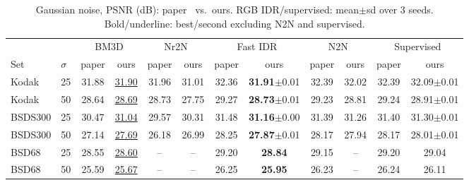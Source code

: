 \begin{table}[!t]
\centering
\caption{Gaussian noise, PSNR (dB): paper~\cite{zhang2022idr} vs.\ ours. RGB IDR/supervised: mean$\pm$sd over 3 seeds. Bold/underline: best/second excluding N2N and supervised.}
\label{tab:img_gauss}
\begin{tabular}{llcccccccccc}
\toprule
& & \multicolumn{2}{c}{BM3D} & \multicolumn{2}{c}{Nr2N} & \multicolumn{2}{c}{Fast IDR} & \multicolumn{2}{c}{N2N} & \multicolumn{2}{c}{Supervised} \\
\cmidrule(lr){3-4}\cmidrule(lr){5-6}\cmidrule(lr){7-8}\cmidrule(lr){9-10}\cmidrule(lr){11-12}
Set & $\sigma$ & paper & ours & paper & ours & paper & ours & paper & ours & paper & ours \\
\midrule
Kodak & 25 & 31.88 & \underline{31.90} & 31.96 & 31.01 & 32.36 & \textbf{31.91}$\pm$0.01 & 32.39 & 32.02 & 32.39 & 32.09$\pm$0.01 \\
Kodak & 50 & 28.64 & \underline{28.69} & 28.73 & 27.75 & 29.27 & \textbf{28.73}$\pm$0.01 & 29.23 & 28.81 & 29.24 & 28.91$\pm$0.01 \\
BSDS300 & 25 & 30.47 & \underline{31.04} & 29.57 & 30.31 & 31.48 & \textbf{31.16}$\pm$0.00 & 31.39 & 31.26 & 31.40 & 31.30$\pm$0.01 \\
BSDS300 & 50 & 27.14 & \underline{27.69} & 26.18 & 26.99 & 28.25 & \textbf{27.87}$\pm$0.01 & 28.17 & 27.94 & 28.17 & 28.01$\pm$0.01 \\
BSD68 & 25 & 28.55 & \underline{28.60} & -- & -- & 29.20 & \textbf{28.84} & 29.15 & -- & 29.20 & 29.04 \\
BSD68 & 50 & 25.59 & \underline{25.67} & -- & -- & 26.25 & \textbf{25.95} & 26.23 & -- & 26.24 & 26.11 \\
\bottomrule
\end{tabular}
\end{table}
